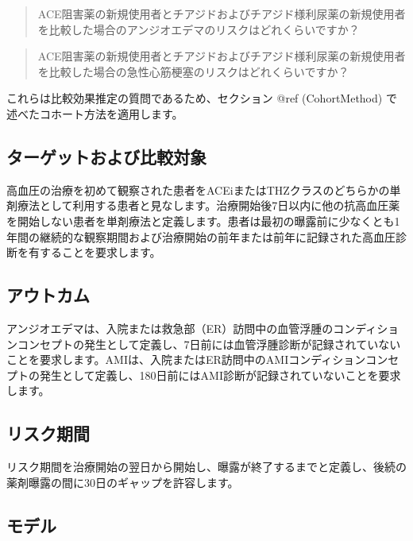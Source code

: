 \documentclass[
  11pt]{book}
\theoremstyle{definition}
\theoremstyle{definition}
\theoremstyle{definition}
\theoremstyle{definition}
\theoremstyle{remark}
\begin{document}
\begin{quote}
ACE阻害薬の新規使用者とチアジドおよびチアジド様利尿薬の新規使用者を比較した場合のアンジオエデマのリスクはどれくらいですか？
\end{quote}

\begin{quote}
ACE阻害薬の新規使用者とチアジドおよびチアジド様利尿薬の新規使用者を比較した場合の急性心筋梗塞のリスクはどれくらいですか？
\end{quote}

これらは比較効果推定の質問であるため、セクション @ref (CohortMethod) で述べたコホート方法を適用します。

\subsection{ターゲットおよび比較対象}\label{ux30bfux30fcux30b2ux30c3ux30c8ux304aux3088ux3073ux6bd4ux8f03ux5bfeux8c61}

高血圧の治療を初めて観察された患者をACEiまたはTHZクラスのどちらかの単剤療法として利用する患者と見なします。治療開始後7日以内に他の抗高血圧薬を開始しない患者を単剤療法と定義します。患者は最初の曝露前に少なくとも1年間の継続的な観察期間および治療開始の前年または前年に記録された高血圧診断を有することを要求します。

\subsection{アウトカム}\label{ux30a2ux30a6ux30c8ux30abux30e0-1}

アンジオエデマは、入院または救急部（ER）訪問中の血管浮腫のコンディションコンセプトの発生として定義し、7日前には血管浮腫診断が記録されていないことを要求します。AMIは、入院またはER訪問中のAMIコンディションコンセプトの発生として定義し、180日前にはAMI診断が記録されていないことを要求します。

\subsection{リスク期間}\label{ux30eaux30b9ux30afux671fux9593-1}

リスク期間を治療開始の翌日から開始し、曝露が終了するまでと定義し、後続の薬剤曝露の間に30日のギャップを許容します。

\subsection{モデル}\label{ux30e2ux30c7ux30eb}
\end{document}

